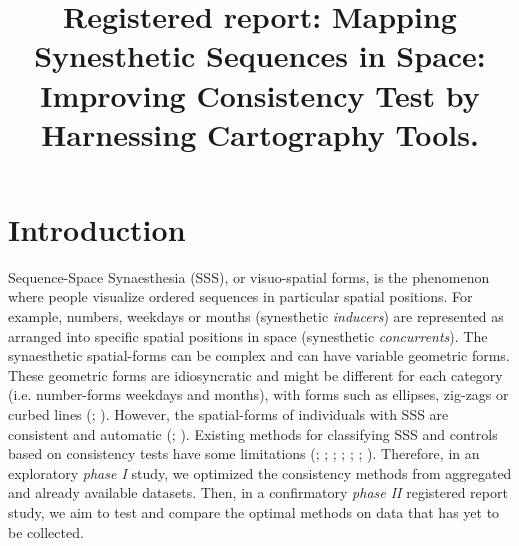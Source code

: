 \documentclass[
  man,
  floatsintext,
  longtable,
  a4paper,
  nolmodern,
  notxfonts,
  notimes,
  colorlinks=true,linkcolor=blue,citecolor=blue,urlcolor=blue]{apa7}
\title{Registered report: Mapping Synesthetic Sequences in Space:
Improving Consistency Test by Harnessing Cartography Tools.}
\affiliation{
{Psychology, UniDistance Suisse}}
\begin{document}
\maketitle



\setcounter{secnumdepth}{3}

\setlength\LTleft{0pt}

\resetlinenumber[1]



\section{Introduction}\label{sec-introduction}

Sequence-Space Synaesthesia (SSS), or visuo-spatial forms, is the
phenomenon where people visualize ordered sequences in particular
spatial positions. For example, numbers, weekdays or months (synesthetic
\emph{inducers}) are represented as arranged into specific spatial
positions in space (synesthetic \emph{concurrents}). The synaesthetic
spatial-forms can be complex and can have variable geometric forms.
These geometric forms are idiosyncratic and might be different for each
category (i.e. number-forms weekdays and months), with forms such as
ellipses, zig-zags or curbed lines
(;
). However, the spatial-forms of
individuals with SSS are consistent and automatic
(;
). Existing methods for
classifying SSS and controls based on consistency tests have some
limitations (;
;
;
;
;
; ). Therefore, in an exploratory \emph{phase I} study, we
optimized the consistency methods from aggregated and already available
datasets. Then, in a confirmatory \emph{phase II} registered report
study, we aim to test and compare the optimal methods on data that has
yet to be collected.
\end{document}
